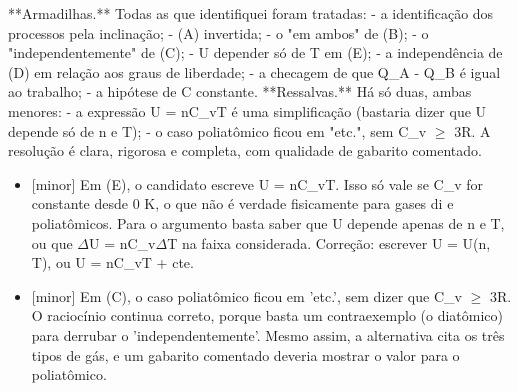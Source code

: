 \documentclass{article}%
\begin{document}
\newline%
**Armadilhas.** Todas as que identifiquei foram tratadas:\newline%
{-} a identificação dos processos pela inclinação;\newline%
{-} (A) invertida;\newline%
{-} o "em ambos" de (B);\newline%
{-} o "independentemente" de (C);\newline%
{-} U depender só de T em (E);\newline%
{-} a independência de (D) em relação aos graus de liberdade;\newline%
{-} a checagem de que Q\_A - Q\_B é igual ao trabalho;\newline%
{-} a hipótese de C constante.\newline%
\newline%
**Ressalvas.** Há só duas, ambas menores:\newline%
{-} a expressão U = nC\_vT é uma simplificação (bastaria dizer que U depende só de n e T);\newline%
{-} o caso poliatômico ficou em "etc.", sem C\_v $\geq$ 3R.\newline%
\newline%
A resolução é clara, rigorosa e completa, com qualidade de gabarito comentado.%
\begin{itemize}%
\item%
{[}minor{]} Em (E), o candidato escreve U = nC\_vT. Isso só vale se C\_v for constante desde 0 K, o que não é verdade fisicamente para gases di e poliatômicos. Para o argumento basta saber que U depende apenas de n e T, ou que $\Delta$U = nC\_v$\Delta$T na faixa considerada. Correção: escrever U = U(n, T), ou U = nC\_vT + cte.%
\item%
{[}minor{]} Em (C), o caso poliatômico ficou em 'etc.', sem dizer que C\_v $\geq$ 3R. O raciocínio continua correto, porque basta um contraexemplo (o diatômico) para derrubar o 'independentemente'. Mesmo assim, a alternativa cita os três tipos de gás, e um gabarito comentado deveria mostrar o valor para o poliatômico.%
\end{itemize}%
\end{document}

